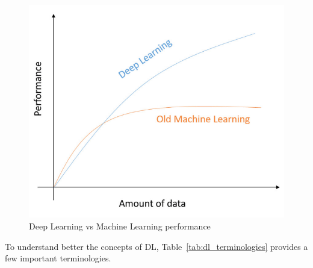 \begin{figure}[htbp]
    \centering
    \includegraphics[width=0.5\linewidth]{Chapters/Figures/DL_vs_ML.png}
    \caption{Deep Learning vs Machine Learning performance~\cite{Alom2019AArchitectures}}
    \label{fig:DL_vs_ML}
\end{figure}

To understand better the concepts of \gls{DL}, Table~\ref{tab:dl_terminologies} provides a few important terminologies.


